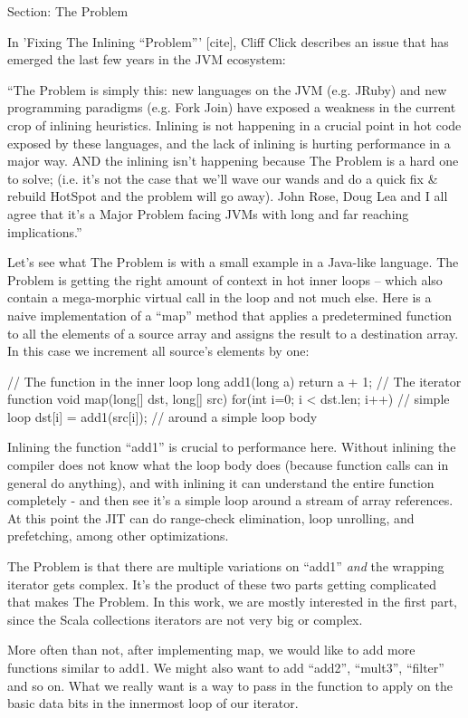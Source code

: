 Section: The Problem

In 'Fixing The Inlining ``Problem''' [cite], Cliff Click describes an issue
that has emerged the last few years in the JVM ecosystem:

``The Problem is simply this: new languages on the JVM (e.g. JRuby) and new
programming paradigms (e.g. Fork Join) have exposed a weakness in the current
crop of inlining heuristics.  Inlining is not happening in a crucial point in
hot code exposed by these languages, and the lack of inlining is hurting
performance in a major way.  AND the inlining isn’t happening because The
Problem is a hard one to solve; (i.e. it’s not the case that we’ll wave our
wands and do a quick fix & rebuild HotSpot and the problem will go away).   John
Rose, Doug Lea and I all agree that it's a Major Problem facing JVMs with long
and far reaching implications.''

Let's see what The Problem is with a small example in a Java-like language. The
Problem is getting the right amount of context in hot inner loops – which also
contain a mega-morphic virtual call in the loop and not much else.  Here is a
naive implementation of a ``map'' method that applies a predetermined
function to all the elements of a source array and assigns the result to a
destination array. In this case we increment all source's elements by one:

// The function in the inner loop
long add1(long a) {return a + 1;}
// The iterator function
void map(long[] dst, long[] src) {
  for(int i=0; i < dst.len; i++) // simple loop
    dst[i] = add1(src[i]); // around a simple loop body
}

Inlining the function ``add1'' is crucial to performance here.  Without
inlining the compiler does not know what the loop body does (because function
calls can in general do anything), and with inlining it can understand the
entire function completely - and then see it’s a simple loop around a stream of
array references.  At this point the JIT can do range-check elimination, loop
unrolling, and prefetching, among other optimizations.

The Problem is that there are multiple variations on ``add1'' \emph{and}
the wrapping iterator gets complex.  It’s the product of these two parts getting
complicated that makes The Problem. In this work, we are mostly interested in
the first part, since the Scala collections iterators are not very big or
complex.

More often than not, after implementing map, we would like to add more
functions similar to add1. We might also want to add ``add2'', ``mult3'',
``filter'' and so on. What we really want is a way to pass in the function to
apply on the basic data bits in the innermost loop of our iterator.


